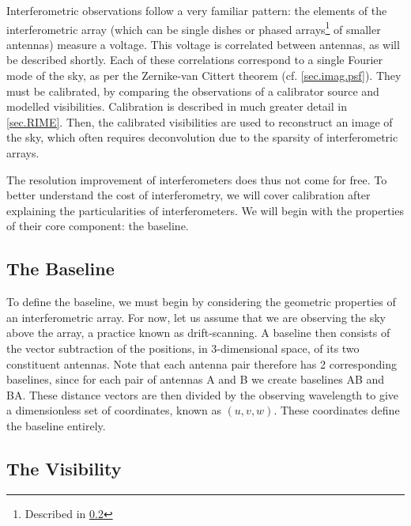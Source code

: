 \pg
Interferometric observations follow a very familiar pattern: the elements of the interferometric array (which can be single dishes or phased arrays\footnote{Described in \cref{sec.visibility}} of smaller antennas) measure a voltage. This voltage is correlated between antennas, as will be described shortly. Each of these correlations correspond to a single Fourier mode of the sky, as per the Zernike-van Cittert theorem (cf. \cref{sec.imag.psf}). They must be calibrated, by comparing the observations of a calibrator source and modelled visibilities. Calibration is described in much greater detail in \cref{sec.RIME}. Then, the calibrated visibilities are used to reconstruct an image of the sky, which often requires deconvolution due to the sparsity of interferometric arrays.

\pg
The resolution improvement of interferometers does thus not come for free. To better understand the cost of interferometry, we will cover calibration after explaining the particularities of interferometers. We will begin with the properties of their core component: the baseline.

\subsection{The Baseline}

\pg
To define the baseline, we must begin by considering the geometric properties of an interferometric array. For now, let us assume that we are observing the sky above the array, a practice known as drift-scanning. A baseline then consists of the vector subtraction of the positions, in 3-dimensional space, of its two constituent antennas. Note that each antenna pair therefore has 2 corresponding baselines, since for each pair of antennas A and B we create baselines AB and BA. These distance vectors are then divided by the observing wavelength to give a dimensionless set of coordinates, known as $(u,v,w)$. These coordinates define the baseline entirely. 

\subsection{The Visibility}\label{sec.visibility}

